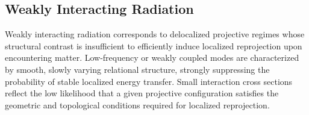 \subsection{Weakly Interacting Radiation}
  \label{subsec:weakly-interacting-radiation}

  Weakly interacting radiation corresponds to delocalized projective
  regimes whose structural contrast is insufficient to efficiently induce
  localized reprojection upon encountering matter.
  Low-frequency or weakly coupled modes are characterized by smooth, slowly
  varying relational structure, strongly suppressing the probability of
  stable localized energy transfer.
  Small interaction cross sections reflect the low likelihood that a given
  projective configuration satisfies the geometric and topological
  conditions required for localized reprojection.
